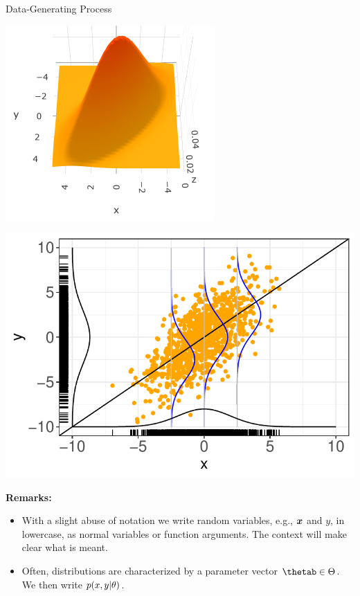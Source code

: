 \documentclass[11pt,compress,t,notes=noshow, xcolor=table]{beamer}
\begin{document}
\begin{vbframe}{Data-Generating Process}
\begin{minipage}{0.5\textwidth}
  \centering
  \includegraphics[width = 0.7\linewidth]{figure/sample-dgp-3d.png}
\end{minipage}%
\begin{minipage}{0.5\textwidth}
  \includegraphics[width = 0.9\linewidth]{figure/sample-dgp-2d.pdf}
\end{minipage}

\framebreak

\textbf{Remarks:}

\begin{itemize}

  \item With a slight abuse of notation we write random variables, e.g., $\bm{x}$ 
  and $y$, in lowercase, as normal variables or function arguments. The context 
  will make clear what is meant.
  
  \item Often, distributions are characterized by a parameter vector 
  $\thetab \in \Theta$. We then write $p(x, y | \theta)$.
  

\end{itemize}
\end{vbframe}
\end{document}
